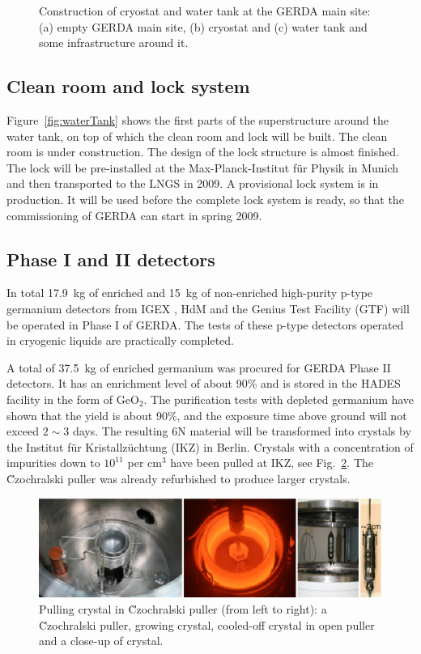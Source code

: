 \begin{figure}[tbhp]
\caption{Construction of cryostat and water tank at the GERDA main site: (a) empty GERDA main site, (b) cryostat and (c) water tank and some infrastructure around it.}
\label{fig:cryo}
\end{figure}

\subsection{Clean room and lock system}
\label{sec:gerda:stat2}
Figure~\ref{fig:waterTank} shows the first parts of the superstructure around the water tank, on top of which the clean room and lock will be built. The clean room is under construction. The design of the lock structure is almost finished. The lock will be pre-installed at the Max-Planck-Institut f\"ur Physik in Munich and then transported to the LNGS in 2009. A provisional lock system is in production. It will be used before the complete lock system is ready, so that the commissioning of GERDA can start in spring 2009.

\subsection{Phase I and II detectors}
\label{sec:gerda:stat3}
In total 17.9~kg of enriched and 15~kg of non-enriched high-purity p-type germanium detectors from IGEX \cite{Aal02}, HdM \cite{Hei04} and the Genius Test Facility (GTF) \cite{Kla02} will be operated in Phase I of GERDA. The tests of these p-type detectors operated in cryogenic liquids are practically completed. 

A total of 37.5~kg of enriched germanium was procured for GERDA Phase II detectors. It has an enrichment level of about 90\% and is stored in the HADES facility in the form of GeO$_{2}$. The purification tests with depleted germanium have shown that the yield is about 90\%, and the exposure time above ground will not exceed $2 \sim 3$ days. The resulting 6N material will be transformed into crystals by the Institut f\"ur Kristallz\"uchtung (IKZ) in Berlin. Crystals with a concentration of impurities down to $10^{11}$ per cm$^{3}$ have been pulled at IKZ, see Fig.~\ref{fig:pulling}. The \u{C}zochralski puller was already refurbished to produce larger crystals.
\begin{figure}[tbhp]
\centering
\includegraphics[width=\textwidth]{crystalPulling}
\caption{Pulling crystal in \u{C}zochralski puller (from left to right): a \u{C}zochralski puller, growing crystal, cooled-off crystal in open puller and a close-up of crystal.}
\label{fig:pulling}
\end{figure}

